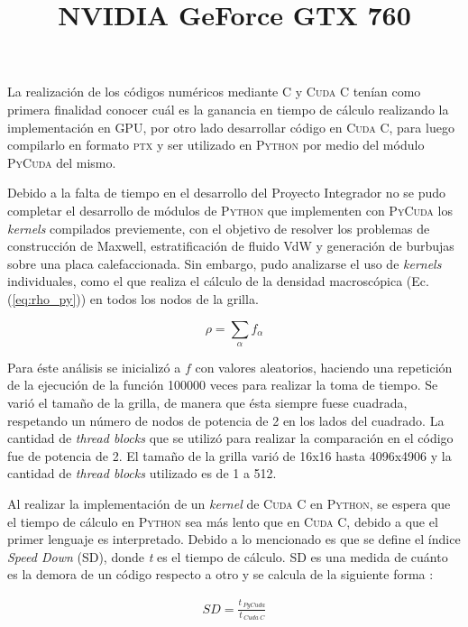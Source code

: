 La realización de los códigos numéricos mediante \textsc{C} y \textsc{Cuda C} tenían como primera finalidad conocer cuál es la ganancia en tiempo de cálculo realizando la implementación en GPU, por otro lado desarrollar código en \textsc{Cuda C}, para luego compilarlo en formato \textsc{ptx} y ser utilizado en \textsc{Python} por medio del módulo \textsc{PyCuda} del mismo.

Debido a la falta de tiempo en el desarrollo del Proyecto Integrador no se pudo completar el desarrollo de módulos de \textsc{Python} que implementen con \textsc{PyCuda} los \textit{kernels} compilados previemente, con el objetivo de resolver los problemas de construcción de Maxwell, estratificación de fluido VdW y generación de burbujas sobre una placa calefaccionada.  Sin embargo, pudo analizarse el uso de \textit{kernels} individuales, como el que realiza el cálculo de la densidad macroscópica (Ec.(\ref{eq:rho_py})) en todos los nodos de la grilla.

\begin{equation}
\rho = \sum_{\alpha} f_{\alpha}
\label{eq:rho_py}
\end{equation}

Para éste análisis se inicializó a $f$ con valores aleatorios, haciendo una repetición de la ejecución de la función 100000 veces para realizar la toma de tiempo. Se varió el tamaño de la grilla, de manera que ésta siempre fuese cuadrada, respetando un número de nodos de potencia de 2 en los lados del cuadrado. La cantidad de \textit{thread blocks} que se utilizó para realizar la comparación en el código fue de potencia de 2. El tamaño de la grilla varió de 16x16 hasta 4096x4906 y la cantidad de \textit{thread blocks} utilizado es de 1 a 512.

Al  realizar la implementación de un \textit{kernel} de \textsc{Cuda C} en \textsc{Python}, se espera que el tiempo de cálculo en \textsc{Python} sea más lento que en \textsc{Cuda C}, debido a que el primer lenguaje es interpretado. Debido a lo mencionado es que se define el índice \textit{Speed Down} (SD), donde \textit{t} es el tiempo de cálculo. SD es una medida de cuánto es la demora de un código respecto a otro y se calcula de la siguiente forma :

\begin{align}
SD = \frac{t_{\>PyCuda}}{t_{\>Cuda \> C}} 
\end{align} 


\title{\textbf{NVIDIA GeForce GTX 760}}
\newline

